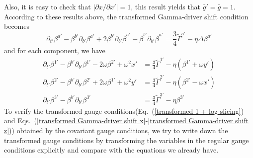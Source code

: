 \documentclass[letterpaper,nofootinbib,prd,amsmath,onecolumn]{revtex4-1}
\begin{document}
Also, it is easy to check that $\left|\partial x/\partial x'\right| = 1$, this result yields that ${\bar g}' = {\bar g} = 1$. According to these results above, the transformed Gamma-driver shift condition becomes
\begin{equation}
\partial_{t'}\beta^{a'} - \beta^{b'}\partial_{b'}\beta^{a'} + 2\beta^{b'}\partial_{b'}{\bar \beta}^{a'} - {\bar \beta}^{b'}\partial_{b'}{\bar \beta}^{a'} = \frac{3}{4}{\tilde \Gamma}^{a'} - \eta \Delta \beta^{a'}
\end{equation}
and for each component, we have
\begin{align}
\partial_{t'}\beta^{1'} - \beta^{b'}\partial_{b'}\beta^{1'} - 2\omega\beta^{2'} + \omega^{2}x' &= \frac{3}{4}{\tilde \Gamma}^{1'} - \eta \left(\beta^{1'} + \omega y'\right)\label{transformed Gamma-driver shift x}\\
\partial_{t'}\beta^{2'} - \beta^{b'}\partial_{b'}\beta^{2'} + 2\omega\beta^{1'} + \omega^{2}y' &= \frac{3}{4}{\tilde \Gamma}^{2'} - \eta \left(\beta^{2'} - \omega x'\right)\label{transformed Gamma-driver shift y}\\
\partial_{t'}\beta^{3'} - \beta^{b'}\partial_{b'}\beta^{3'} & = \frac{3}{4}{\tilde \Gamma}^{3'} - \eta \beta^{3'}\label{transformed Gamma-driver shift z}
\end{align}
To verify the transformed gauge conditions(Eq.~(\ref{transformed 1 + log slicing}) and Eqs.~(\ref{transformed Gamma-driver shift x}-\ref{transformed Gamma-driver shift z})) obtained by the covariant gauge conditions, we try to write down the transformed gauge conditions by transforming the variables in the regular gauge conditions explicitly and compare with the equations we already have. 
\end{document}
